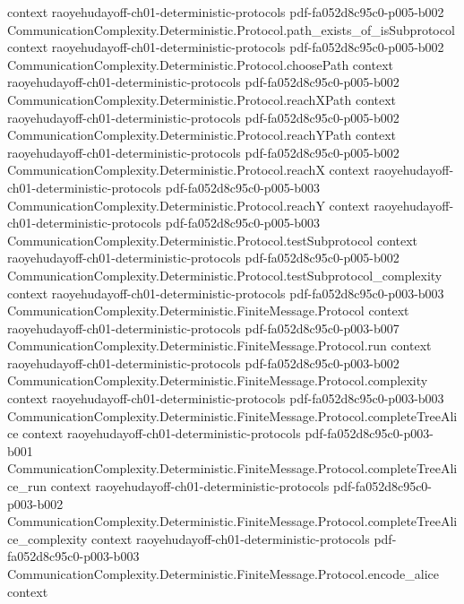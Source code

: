 \begin{theorem}
  {context}
  {raoyehudayoff-ch01-deterministic-protocols}
  {pdf-fa052d8c95c0-p005-b002}
\proofstep
  {CommunicationComplexity.Deterministic.Protocol.path_exists_of_isSubprotocol}
  {context}
  {raoyehudayoff-ch01-deterministic-protocols}
  {pdf-fa052d8c95c0-p005-b002}
\proofstep
  {CommunicationComplexity.Deterministic.Protocol.choosePath}
  {context}
  {raoyehudayoff-ch01-deterministic-protocols}
  {pdf-fa052d8c95c0-p005-b002}
\proofstep
  {CommunicationComplexity.Deterministic.Protocol.reachXPath}
  {context}
  {raoyehudayoff-ch01-deterministic-protocols}
  {pdf-fa052d8c95c0-p005-b002}
\proofstep
  {CommunicationComplexity.Deterministic.Protocol.reachYPath}
  {context}
  {raoyehudayoff-ch01-deterministic-protocols}
  {pdf-fa052d8c95c0-p005-b002}
\proofstep
  {CommunicationComplexity.Deterministic.Protocol.reachX}
  {context}
  {raoyehudayoff-ch01-deterministic-protocols}
  {pdf-fa052d8c95c0-p005-b003}
\proofstep
  {CommunicationComplexity.Deterministic.Protocol.reachY}
  {context}
  {raoyehudayoff-ch01-deterministic-protocols}
  {pdf-fa052d8c95c0-p005-b003}
\proofstep
  {CommunicationComplexity.Deterministic.Protocol.testSubprotocol}
  {context}
  {raoyehudayoff-ch01-deterministic-protocols}
  {pdf-fa052d8c95c0-p005-b002}
\proofstep
  {CommunicationComplexity.Deterministic.Protocol.testSubprotocol_complexity}
  {context}
  {raoyehudayoff-ch01-deterministic-protocols}
  {pdf-fa052d8c95c0-p003-b003}
\proofstep
  {CommunicationComplexity.Deterministic.FiniteMessage.Protocol}
  {context}
  {raoyehudayoff-ch01-deterministic-protocols}
  {pdf-fa052d8c95c0-p003-b007}
\proofstep
  {CommunicationComplexity.Deterministic.FiniteMessage.Protocol.run}
  {context}
  {raoyehudayoff-ch01-deterministic-protocols}
  {pdf-fa052d8c95c0-p003-b002}
\proofstep
  {CommunicationComplexity.Deterministic.FiniteMessage.Protocol.complexity}
  {context}
  {raoyehudayoff-ch01-deterministic-protocols}
  {pdf-fa052d8c95c0-p003-b003}
\proofstep
  {CommunicationComplexity.Deterministic.FiniteMessage.Protocol.completeTreeAlice}
  {context}
  {raoyehudayoff-ch01-deterministic-protocols}
  {pdf-fa052d8c95c0-p003-b001}
\proofstep
  {CommunicationComplexity.Deterministic.FiniteMessage.Protocol.completeTreeAlice_run}
  {context}
  {raoyehudayoff-ch01-deterministic-protocols}
  {pdf-fa052d8c95c0-p003-b002}
\proofstep
  {CommunicationComplexity.Deterministic.FiniteMessage.Protocol.completeTreeAlice_complexity}
  {context}
  {raoyehudayoff-ch01-deterministic-protocols}
  {pdf-fa052d8c95c0-p003-b003}
\proofstep
  {CommunicationComplexity.Deterministic.FiniteMessage.Protocol.encode_alice}
  {context}

\end{theorem}
